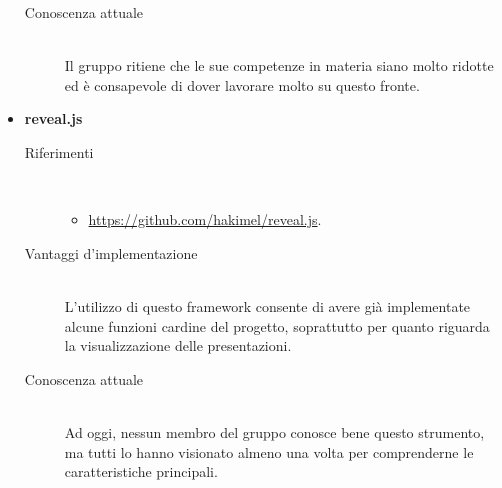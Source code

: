 \begin{itemize}
\begin{description}
		\item[Conoscenza attuale]\ \\
		\noindent Il gruppo ritiene che le sue competenze in materia siano molto ridotte ed è consapevole di dover lavorare molto su questo fronte.
	\end{description}
	
	\item \textbf{reveal.js}
	\begin{description}
		\item[Riferimenti]\ 
		\noindent\begin{itemize}
			\item \url{https://github.com/hakimel/reveal.js}.
		\end{itemize}
		
		\item[Vantaggi d'implementazione]\ \\ 
		\noindent L'utilizzo di questo framework consente di avere già implementate alcune funzioni cardine del progetto, soprattutto per quanto riguarda la visualizzazione delle presentazioni.
		
		\item[Conoscenza attuale]\ \\
		\noindent Ad oggi, nessun membro del gruppo conosce bene questo strumento, ma tutti lo hanno visionato almeno una volta per comprenderne le caratteristiche principali.
	\end{description}
\end{itemize}
